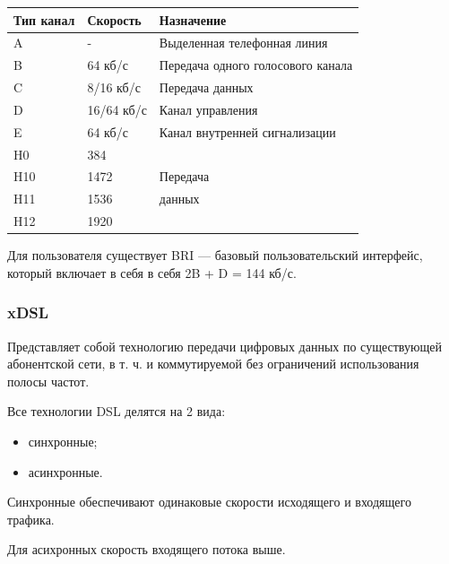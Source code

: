 \documentclass[12pt, russian, oneside, article]{ncc}
\begin{document}
\begin{center}
\begin{tabular}{lll}
 Тип канал  &  Скорость    &  Назначение                         \\
\hline
 A          &  -           &  Выделенная телефонная линия        \\
 B          &  64 кб/с     &  Передача одного голосового канала  \\
 C          &  8/16 кб/с   &  Передача данных                    \\
 D          &  16/64 кб/с  &  Канал управления                   \\
 E          &  64 кб/с     &  Канал внутренней сигнализации      \\
 H0         &  384         &                                     \\
 H10        &  1472        &  Передача                           \\
 H11        &  1536        &  данных                             \\
 H12        &  1920        &                                     \\
\end{tabular}
\end{center}



Для пользователя существует BRI --- базовый пользовательский интерфейс, который включает в себя в себя 2B + D = 144 кб/с.
\subsubsection{xDSL}
\label{sec-5_2_10}


Представляет собой технологию передачи цифровых данных по существующей абонентской сети, в т. ч. и коммутируемой без ограничений использования полосы частот.

Все технологии DSL делятся на 2 вида:
\begin{itemize}
\item синхронные;
\item асинхронные.
\end{itemize}

Синхронные обеспечивают одинаковые скорости исходящего и входящего трафика.

Для асихронных скорость входящего потока выше.
\end{document}
